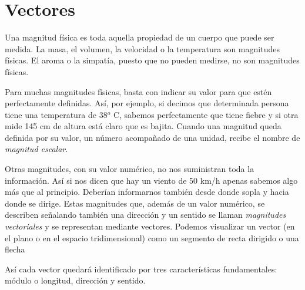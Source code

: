 \vspace{5mm}
\section{Vectores}
\vspace{0.5cm}	
	
	
Una magnitud física es toda aquella propiedad de un cuerpo que puede ser medida. La masa, el volumen, la velocidad o la temperatura son magnitudes físicas. El aroma o la simpatía, puesto que no pueden medirse, no son magnitudes físicas.

Para muchas magnitudes físicas, basta con indicar su valor para que estén perfectamente definidas. Así, por ejemplo, si decimos que determinada persona tiene una temperatura de 38$^o$ C, sabemos perfectamente que tiene fiebre y si otra mide 145 cm de altura está claro que es bajita. Cuando una magnitud queda definida por su valor, un número acompañado de una unidad, recibe el nombre de \emph{magnitud escalar}.

Otras magnitudes, con su valor numérico, no nos suministran toda la información. Así si nos dicen que hay un viento de 50 km/h apenas sabemos algo más que al principio. Deberían informarnos también desde donde sopla y hacia donde se dirige. Estas magnitudes que, además de un valor numérico, se describen señalando también una dirección y un sentido se llaman \emph{magnitudes vectoriales} y se representan mediante vectores. Podemos visualizar un vector (en el plano o en el espacio tridimensional) como un segmento de recta dirigido o una flecha

Así cada vector quedará identificado por tres características fundamentales: módulo o longitud, dirección y sentido.	
	
